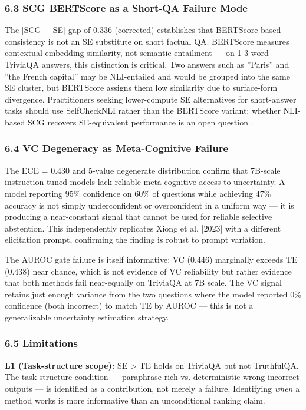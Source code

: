 \subsubsection{6.3 SCG BERTScore as a Short-QA Failure Mode}

The |SCG $-$ SE| gap of 0.336 (corrected) establishes that BERTScore-based consistency is not an SE substitute on short factual QA. BERTScore measures contextual embedding similarity, not semantic entailment --- on 1-3 word TriviaQA answers, this distinction is critical. Two answers such as ''Paris'' and ''the French capital'' may be NLI-entailed and would be grouped into the same SE cluster, but BERTScore assigns them low similarity due to surface-form divergence. Practitioners seeking lower-compute SE alternatives for short-answer tasks should use SelfCheckNLI rather than the BERTScore variant; whether NLI-based SCG recovers SE-equivalent performance is an open question \citep{Manakul2023SelfCheckGPT}.

\subsubsection{6.4 VC Degeneracy as Meta-Cognitive Failure}

The ECE = 0.430 and 5-value degenerate distribution confirm that 7B-scale instruction-tuned models lack reliable meta-cognitive access to uncertainty. A model reporting 95\% confidence on 60\% of questions while achieving 47\% accuracy is not simply underconfident or overconfident in a uniform way --- it is producing a near-constant signal that cannot be used for reliable selective abstention. This independently replicates Xiong et al. [2023] with a different elicitation prompt, confirming the finding is robust to prompt variation.

The AUROC gate failure is itself informative: VC (0.446) marginally exceeds TE (0.438) near chance, which is not evidence of VC reliability but rather evidence that both methods fail near-equally on TriviaQA at 7B scale. The VC signal retains just enough variance from the two questions where the model reported 0\% confidence (both incorrect) to match TE by AUROC --- this is not a generalizable uncertainty estimation strategy.

\subsubsection{6.5 Limitations}

\textbf{L1 (Task-structure scope):} SE > TE holds on TriviaQA but not TruthfulQA. The task-structure condition --- paraphrase-rich vs. deterministic-wrong incorrect outputs --- is identified as a contribution, not merely a failure. Identifying \textit{when} a method works is more informative than an unconditional ranking claim.

